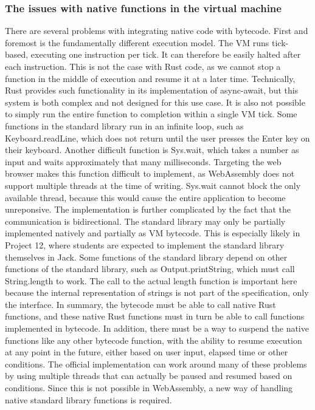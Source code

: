 \subsubsection{The issues with native functions in the virtual machine} \label{stdlib-issues}
There are several problems with integrating native code with bytecode.
First and foremost is the fundamentally different execution model. The VM runs tick-based, executing one instruction per tick. It can therefore be easily halted after each instruction.
This is not the case with Rust code, as we cannot stop a function in the middle of execution and resume it at a later time.
Technically, Rust provides such functionality in its implementation of async-await, but this system is both complex and not designed for this use case.
It is also not possible to simply run the entire function to completion within a single VM tick. Some functions in the standard library run in an infinite loop, such as Keyboard.readLine, which does not return until the user presses the Enter key on their keyboard.
Another difficult function is Sys.wait, which takes a number as input and waits approximately that many milliseconds.
Targeting the web browser makes this function difficult to implement, as WebAssembly does not support multiple threads at the time of writing. Sys.wait cannot block the only available thread, because this would cause the entire application to become unreponsive.
The implementation is further complicated by the fact that the communication is bidirectional. The standard library may only be partially implemented natively and partially as VM bytecode. This is especially likely in Project 12, where students are expected to implement the standard library themselves in Jack.
Some functions of the standard library depend on other functions of the standard library, such as Output.printString, which must call String.length to work. The call to the actual length function is important here because the internal representation of strings is not part of the specification, only the interface.
In summary, the bytecode must be able to call native Rust functions, and these native Rust functions must in turn be able to call functions implemented in bytecode. In addition, there must be a way to suspend the native functions like any other bytecode function, with the ability to resume execution at any point in the future, either based on user input, elapsed time or other conditions.
The official implementation can work around many of these problems by using multiple threads that can actually be paused and resumed based on conditions.
Since this is not possible in WebAssembly, a new way of handling native standard library functions is required.

